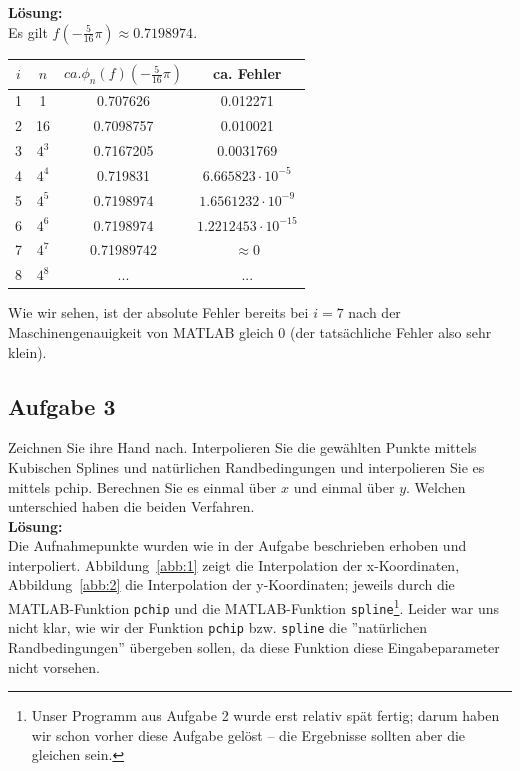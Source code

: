 \documentclass[11pt,a4paper,ngerman]{article}
\begin{document}
\textbf{Lösung:}\\
Es gilt $f(-\frac{5}{16} \pi) \approx 0.7198974$.

\begin{tabular}{c|c|c||c}
$i$ & $n$ & $ca. \phi_n(f)(-\frac{5}{16} \pi)$ & ca. Fehler \\
\hline \hline
1 & 1 & 0.707626 & 0.012271 \\
2 & 16 & 0.7098757 & 0.010021 \\
3 & $4^3$ &  0.7167205 &  0.0031769 \\
4 & $4^4$ & 0.719831 & $6.665823\cdot 10^{-5}$ \\
5 & $4^5$ & 0.7198974 &  $1.6561232\cdot 10^{-9}$ \\
6 & $4^6$ & 0.7198974 &  $1.2212453\cdot 10^{-15}$ \\
7 & $4^7$ &  0.71989742 & $\approx 0$ \\
8 & $4^8$ & ... & ...
\end{tabular}

Wie wir sehen, ist der absolute Fehler bereits bei $i = 7$ nach der Maschinengenauigkeit von MATLAB gleich 0 (der tatsächliche Fehler also sehr klein).

\subsection*{Aufgabe 3}

Zeichnen Sie ihre Hand nach. Interpolieren Sie die gewählten Punkte mittels Kubischen Splines und natürlichen Randbedingungen
und interpolieren Sie es mittels pchip. Berechnen Sie es einmal über $x$ und einmal über $y$. Welchen unterschied
haben die beiden Verfahren.\\

\textbf{Lösung:}\\

Die Aufnahmepunkte wurden wie in der Aufgabe beschrieben erhoben und interpoliert. Abbildung~\ref{abb:1} zeigt die Interpolation der x-Koordinaten, Abbildung~\ref{abb:2} die Interpolation der y-Koordinaten; jeweils durch  die MATLAB-Funktion \texttt{pchip} und die MATLAB-Funktion \texttt{spline}\footnote{Unser Programm aus Aufgabe 2 wurde erst relativ spät fertig; darum haben wir schon vorher diese Aufgabe gelöst -- die Ergebnisse sollten aber die gleichen sein.}.
Leider war uns nicht klar, wie wir der Funktion \texttt{pchip} bzw. \texttt{spline} die ''natürlichen Randbedingungen'' übergeben sollen, da diese Funktion diese Eingabeparameter nicht vorsehen.
\end{document}
